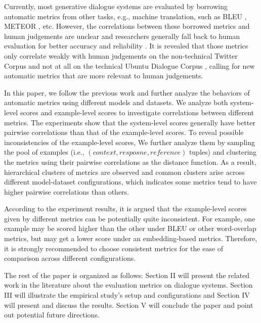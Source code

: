 \documentclass[conference]{IEEEtran}
\begin{document}
Currently, most generative dialogue systems are evaluated by borrowing automatic metrics from other tasks, e.g., machine translation, such as BLEU \cite{BLEU}, METEOR \cite{METEOR}, etc.
However, the correlations between these borrowed metrics and human judgements are unclear and researchers generally fall back to human evaluation for better accuracy and reliability \cite{VHRED,Shang}.
It is revealed that those metrics only correlate weakly with human judgements on the non-technical Twitter Corpus and not at all on the technical Ubuntu Dialogue Corpus \cite{HowNot}, calling for new automatic metrics that are more relevant to human judgements.

In this paper, we follow the previous work and further analyze the behaviors of automatic metrics using different models and datasets. 
We analyze both system-level scores and example-level scores to investigate correlations between different metrics.
The experiments show that the system-level scores generally have better pairwise correlations than that of the example-level scores.
To reveal possible inconsistencies of the example-level scores,
We further analyze them by sampling the pool of examples (i.e., $(context, resposne, reference)$ tuples) and clustering the metrics using their pairwise correlations as the distance function.
As a result, hierarchical clusters of metrics are observed and common clusters arise across different model-dataset configurations,
which indicates some metrics tend to have higher pairwise correlations than others.

According to the experiment results, it is argued that the example-level scores given by different metrics can be potentially quite inconsistent.
For example, one example may be scored higher than the other under BLEU or other word-overlap metrics, but may get a lower score under an embedding-based metrics.
Therefore, it is strongly recommended to choose consistent metrics for the ease of comparison across different configurations.

The rest of the paper is organized as follows: Section II will present the related work in the literature about the evaluation metrics on dialogue systems.
Section III will illustrate the empirical study's setup and configurations and Section IV will present and discuss the results.
Section V will conclude the paper and point out potential future directions.
\end{document}
